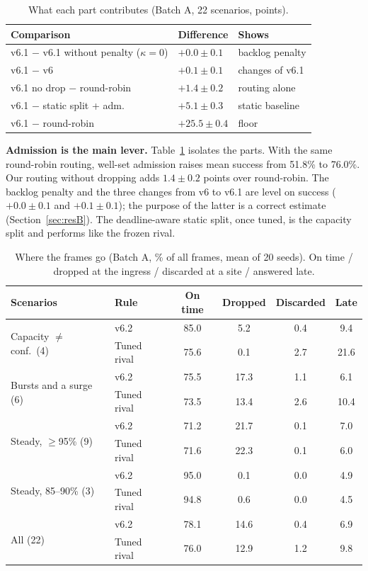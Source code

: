 \documentclass[conference]{IEEEtran}
\begin{document}
\begin{table}[t]
\centering
\caption{What each part contributes (Batch A, 22 scenarios, points).}
\label{tab:parts}
\footnotesize
\setlength{\tabcolsep}{3pt}
\begin{tabular}{@{}lll@{}}
\toprule
Comparison & Difference & Shows\\
\midrule
v6.1 $-$ v6.1 without penalty ($\kappa=0$) & $+0.0 \pm 0.1$ & backlog penalty\\
v6.1 $-$ v6 & $+0.1 \pm 0.1$ & changes of v6.1\\
v6.1 no drop $-$ round-robin & $+1.4 \pm 0.2$ & routing alone\\
v6.1 $-$ static split + adm. & $+5.1 \pm 0.3$ & static baseline\\
v6.1 $-$ round-robin & $+25.5 \pm 0.4$ & floor\\
\bottomrule
\end{tabular}
\end{table}

\textbf{Admission is the main lever.} Table~\ref{tab:parts} isolates the parts. With the same round-robin routing, well-set admission raises mean success from 51.8\% to 76.0\%. Our routing without dropping adds $1.4 \pm 0.2$ points over round-robin. The backlog penalty and the three changes from v6 to v6.1 are level on success ($+0.0 \pm 0.1$ and $+0.1 \pm 0.1$); the purpose of the latter is a correct estimate (Section~\ref{sec:resB}). The deadline-aware static split, once tuned, is the capacity split and performs like the frozen rival.

\begin{table}[t]
\centering
\caption{Where the frames go (Batch A, \% of all frames, mean of 20 seeds). On time / dropped at the ingress / discarded at a site / answered late.}
\label{tab:breakdown}
\footnotesize
\setlength{\tabcolsep}{3pt}
\begin{tabular}{@{}llcccc@{}}
\toprule
Scenarios & Rule & On time & Dropped & Discarded & Late\\
\midrule
\multirow{2}{*}{Capacity $\neq$ conf.\ (4)} & v6.2 & 85.0 & 5.2 & 0.4 & 9.4\\
 & Tuned rival & 75.6 & 0.1 & 2.7 & 21.6\\
\multirow{2}{*}{Bursts and a surge (6)} & v6.2 & 75.5 & 17.3 & 1.1 & 6.1\\
 & Tuned rival & 73.5 & 13.4 & 2.6 & 10.4\\
\multirow{2}{*}{Steady, $\ge$95\% (9)} & v6.2 & 71.2 & 21.7 & 0.1 & 7.0\\
 & Tuned rival & 71.6 & 22.3 & 0.1 & 6.0\\
\multirow{2}{*}{Steady, 85--90\% (3)} & v6.2 & 95.0 & 0.1 & 0.0 & 4.9\\
 & Tuned rival & 94.8 & 0.6 & 0.0 & 4.5\\
\midrule
\multirow{2}{*}{All (22)} & v6.2 & 78.1 & 14.6 & 0.4 & 6.9\\
 & Tuned rival & 76.0 & 12.9 & 1.2 & 9.8\\
\bottomrule
\end{tabular}
\end{table}
\end{document}
